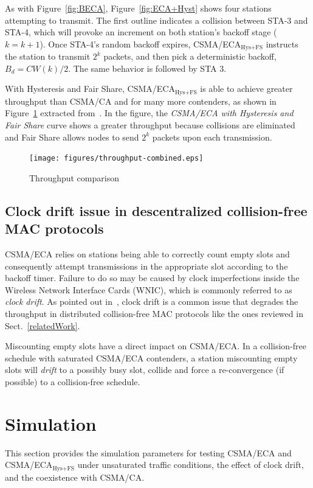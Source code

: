 \documentclass[a4paper,journal]{IEEEtran}
\begin{document}
	As with Figure~\ref{fig:BECA}, Figure~\ref{fig:ECA+Hyst} shows four stations attempting to transmit. The first outline indicates a collision between STA-3 and STA-4, which will provoke an increment on both station's backoff stage ($k=k+1$). Once STA-4's random backoff expires, CSMA/ECA$_{\text{Hys+FS}}$ instructs the station to transmit $2^{k}$ packets, and then pick a deterministic backoff, $B_{d}=CW(k)/2$. The same behavior is followed by STA 3.
	
	With Hysteresis and Fair Share, CSMA/ECA$_{\text{Hys+FS}}$ is able to achieve greater throughput than CSMA/CA and for many more contenders, as shown in Figure~\ref{fig:ECA+H+F-throughput} extracted from~\cite{research2standards}. In the figure, the \emph{CSMA/ECA with Hysteresis and Fair Share} curve shows a greater throughput because collisions are eliminated and Fair Share allows nodes to send $2^{k}$ packets upon each transmission.

	\begin{figure}[htbp]
	\centering
		\texttt{[image: figures/throughput-combined.eps]}
		\caption{Throughput comparison~\cite{research2standards}}
		\label{fig:ECA+H+F-throughput}
	\end{figure}
	
	\subsection{Clock drift issue in descentralized collision-free MAC protocols}\label{clockDrift-issue}
	CSMA/ECA relies on stations being able to correctly count empty slots and consequently attempt transmissions in the appropriate slot according to the backoff timer. Failure to do so may be caused by clock imperfections inside the Wireless Network Interface Cards (WNIC), which is commonly referred to as \emph{clock drift}. As pointed out in~\cite{slotDrift}, clock drift is a common issue that degrades the throughput in distributed collision-free MAC protocols like the ones reviewed in Sect.~\ref{relatedWork}.
	
	Miscounting empty slots have a direct impact on CSMA/ECA. In a collision-free schedule with saturated CSMA/ECA contenders, a station miscounting empty slots will \emph{drift} to a possibly busy slot, collide and force a re-convergence (if possible) to a collision-free schedule. 
	
\section{Simulation}\label{simulations}
This section provides the simulation parameters for testing CSMA/ECA and CSMA/ECA$_{\text{Hys+FS}}$ under unsaturated traffic conditions, the effect of clock drift, and the coexistence with CSMA/CA.
\end{document}
